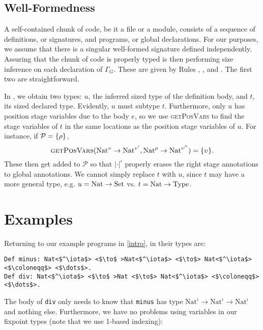 \documentclass[sigplan,10pt,anonymous,review]{acmart}
\begin{document}
\subsection{Well-Formedness}

A self-contained chunk of code, be it a file or a module, consists of a sequence of \coinductive definitions, or signatures, and programs, or global declarations. For our purposes, we assume that there is a singular well-formed signature defined independently. Assuring that the chunk of code is properly typed is then performing size inference on each declaration of $\Gamma_G$. These are given by Rules , , and . The first two are straightforward.

In , we obtain two types: $u$, the inferred sized type of the definition body, and $t$, its sized declared type. Evidently, $u$ must subtype $t$. Furthermore, only $u$ has position stage variables due to the body $e$, so we use \textsc{getPosVars} to find the stage variables of $t$ in the same locations as the position stage variables of $u$. For instance, if $\mathcal{P} = \{\rho\}$, $$\textsc{getPosVars}(\text{Nat}^\upsilon \to \text{Nat}^{\upsilon'}, \text{Nat}^\rho \to \text{Nat}^{\upsilon''}) = \{\upsilon\}.$$ These then get added to $\mathcal{P}$ so that $|\cdot|^\iota$ properly erases the right stage annotations to global annotations. We cannot simply replace $t$ with $u$, since $t$ may have a more general type, e.g. $u = \text{Nat} \to \text{Set}$ vs. $t = \text{Nat} \to \text{Type}_{}$.

\section{Examples}\label{examples}

Returning to our example programs in \autoref{intro}, in \lang their types are:

\begin{verbatim}
Def minus: Nat<$^\iota$> <$\to$ >Nat<$^\iota$> <$\to$> Nat<$^\iota$> <$\coloneqq$> <$\dots$>.
Def div: Nat<$^\iota$> <$\to$ >Nat <$\to$> Nat<$^\iota$> <$\coloneqq$> <$\dots$>.
\end{verbatim}

The body of \texttt{div} only needs to know that \texttt{minus} has type $\text{Nat}^\iota \to \text{Nat}^\iota \to \text{Nat}^\iota$ and nothing else. Furthermore, we have no problems using variables in our fixpoint types (note that we use 1-based indexing):
\end{document}
